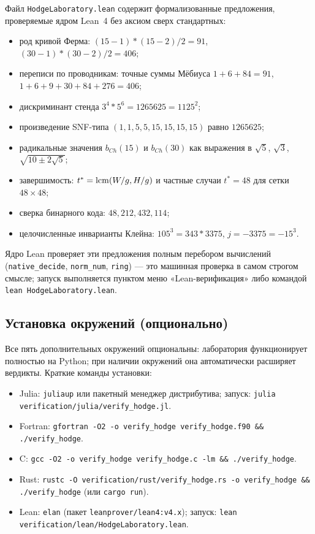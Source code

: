 Файл \texttt{HodgeLaboratory.lean} содержит формализованные
предложения, проверяемые ядром Lean~4 без аксиом сверх стандартных:
\begin{itemize}[leftmargin=1.6em, itemsep=0.1em]
\item род кривой Ферма: $(15-1)*(15-2)/2=91$,
  $(30-1)*(30-2)/2=406$;
\item переписи по проводникам: точные суммы Мёбиуса
  $1+6+84=91$, $1+6+9+30+84+276=406$;
\item дискриминант стенда $3^4*5^6=1265625=1125^2$;
\item произведение SNF-типа $(1,1,5,5,15,15,15,15)$ равно
  $1265625$;
\item радикальные значения $b_{Ch}(15)$ и $b_{Ch}(30)$ как
  выражения в $\sqrt5$, $\sqrt3$, $\sqrt{10\pm2\sqrt5}$;
\item завершимость: $t^*=\operatorname{lcm}(W/g, H/g)$ и частные случаи
  $t^*=48$ для сетки $48\times48$;
\item сверка бинарного кода: $48,212,432,114$;
\item целочисленные инварианты Клейна: $105^3=343*3375$,
  $j=-3375=-15^3$.
\end{itemize}
Ядро Lean проверяет эти предложения полным перебором вычислений
(\texttt{native\_decide}, \texttt{norm\_num}, \texttt{ring}) ---
это машинная проверка в самом строгом смысле; запуск выполняется
пунктом меню «Lean-верификация» либо командой
\texttt{lean HodgeLaboratory.lean}.

\subsection{Установка окружений (опционально)}

Все пять дополнительных окружений опциональны: лаборатория
функционирует полностью на Python; при наличии окружений она
автоматически расширяет вердикты. Краткие команды установки:

\begin{itemize}[leftmargin=1.6em, itemsep=0.1em]
\item Julia: \texttt{juliaup} или пакетный менеджер дистрибутива;
  запуск: \texttt{julia verification/julia/verify\_hodge.jl}.
\item Fortran: \texttt{gfortran -O2 -o verify\_hodge
  verify\_hodge.f90 \&\& ./verify\_hodge}.
\item C: \texttt{gcc -O2 -o verify\_hodge verify\_hodge.c -lm
  \&\& ./verify\_hodge}.
\item Rust: \texttt{rustc -O verification/rust/verify\_hodge.rs -o
  verify\_hodge \&\& ./verify\_hodge} (или \texttt{cargo run}).
\item Lean: \texttt{elan} (пакет \texttt{leanprover/lean4:v4.x});
  запуск: \texttt{lean verification/lean/HodgeLaboratory.lean}.
\end{itemize}


